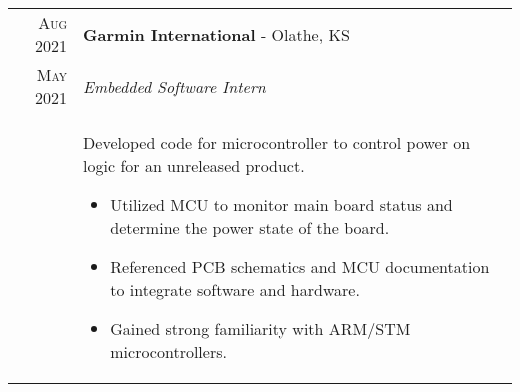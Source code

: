 \documentclass[a4paper,12pt]{article}
\begin{document}
%
%
\begin{tabularx}{\textwidth}{r|X}
   \textsc{Aug 2021} & \textbf{Garmin International} \-- Olathe, KS\\
   \textsc{May 2021} & \emph{Embedded Software Intern}\\
   & \small{Developed code for microcontroller to control power on logic for an unreleased product.
      \begin{itemize}[leftmargin=20pt,topsep=1pt,itemsep=1pt,partopsep=0pt, parsep=1pt]
        \item Utilized MCU to monitor main board status and determine the power state of the board.
        \item Referenced PCB schematics and MCU documentation to integrate software and hardware.
        \item Gained strong familiarity with ARM/STM microcontrollers.
      \vspace{-0.5cm}
      \end{itemize}}\\
\end{tabularx}
\end{document}
